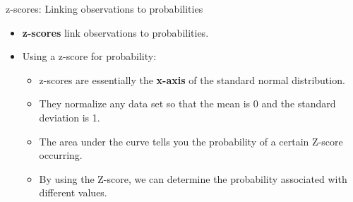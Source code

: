 \documentclass[
  ignorenonframetext,
]{beamer}
\providecommand{\tightlist}{%
  \setlength{\itemsep}{0pt}\setlength{\parskip}{0pt}}
\begin{document}
\begin{frame}{z-scores: Linking observations to probabilities}
\label{z-scores-linking-observations-to-probabilities}
\begin{itemize}
\tightlist
\item
  \textbf{z-scores} link observations to probabilities.
\end{itemize}

\begin{itemize}
\tightlist
\item
  Using a z-score for probability:

  \begin{itemize}
  \tightlist
  \item
    z-scores are essentially the \textbf{x-axis} of the standard normal
    distribution.
  \item
    They normalize any data set so that the mean is 0 and the standard
    deviation is 1.
  \item
    The area under the curve tells you the probability of a certain
    Z-score occurring.
  \item
    By using the Z-score, we can determine the probability associated
    with different values.
  \end{itemize}
\end{itemize}
\end{frame}
\end{document}
